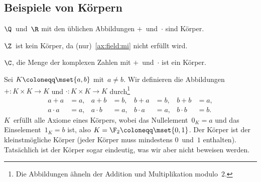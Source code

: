 \documentclass[a4paper]{article}
\begin{document}
\subsection{Beispiele von Körpern}

\begin{example}
    $\Q$~und~$\R$ mit den üblichen Abbildungen $+$~und~$\cdot$ sind Körper.
\end{example}

\begin{example}
    $\Z$~ist kein Körper, da (nur)~\ref{ax:field:mi} nicht erfüllt wird.
\end{example}

\begin{example}
    $\C$, die Menge der komplexen Zahlen mit $+$~und~$\cdot$ ist ein Körper.
\end{example}

\begin{example}
    Sei $K \coloneqq \mset{a, b}$ mit~$a \neq b$. Wir definieren die Abbildungen $+\colon K \times K \to K$ und $\cdot\colon K \times K \to K$ durch\footnote{Die Abbildungen ähneln der Addition und Multiplikation modulo~$2$.}
    \begin{align*}
        a + a     & = a, & a + b     & = b, & b + a     & = b, & b + b     & = a, \\
        a \cdot a & = a, & a \cdot b & = a, & b \cdot a & = a, & b \cdot b & = b.
    \end{align*}
    $K$~erfüllt alle Axiome eines Körpers, wobei das Nullelement~$0_K = a$ und das Einselement~$1_K = b$ ist, also $K = \F_2 \coloneqq \mset{0, 1}$. Der Körper ist der kleinstmögliche Körper (jeder Körper muss mindestens $0$~und~$1$ enthalten). Tatsächlich ist der Körper sogar eindeutig, was wir aber nicht beweisen werden.
\end{example}
\end{document}

